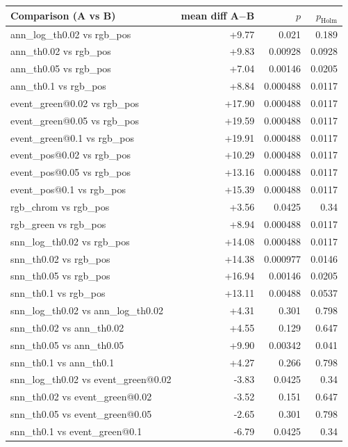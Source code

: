 \begin{tabular}{lrrr}\toprule
Comparison (A vs B) & mean diff A$-$B & $p$ & $p_{\mathrm{Holm}}$ \\\midrule
ann\_log\_th0.02 vs rgb\_pos & +9.77 & 0.021 & 0.189 \\
ann\_th0.02 vs rgb\_pos & +9.83 & 0.00928 & 0.0928 \\
ann\_th0.05 vs rgb\_pos & +7.04 & 0.00146 & 0.0205 \\
ann\_th0.1 vs rgb\_pos & +8.84 & 0.000488 & 0.0117 \\
event\_green@0.02 vs rgb\_pos & +17.90 & 0.000488 & 0.0117 \\
event\_green@0.05 vs rgb\_pos & +19.59 & 0.000488 & 0.0117 \\
event\_green@0.1 vs rgb\_pos & +19.91 & 0.000488 & 0.0117 \\
event\_pos@0.02 vs rgb\_pos & +10.29 & 0.000488 & 0.0117 \\
event\_pos@0.05 vs rgb\_pos & +13.16 & 0.000488 & 0.0117 \\
event\_pos@0.1 vs rgb\_pos & +15.39 & 0.000488 & 0.0117 \\
rgb\_chrom vs rgb\_pos & +3.56 & 0.0425 & 0.34 \\
rgb\_green vs rgb\_pos & +8.94 & 0.000488 & 0.0117 \\
snn\_log\_th0.02 vs rgb\_pos & +14.08 & 0.000488 & 0.0117 \\
snn\_th0.02 vs rgb\_pos & +14.38 & 0.000977 & 0.0146 \\
snn\_th0.05 vs rgb\_pos & +16.94 & 0.00146 & 0.0205 \\
snn\_th0.1 vs rgb\_pos & +13.11 & 0.00488 & 0.0537 \\
snn\_log\_th0.02 vs ann\_log\_th0.02 & +4.31 & 0.301 & 0.798 \\
snn\_th0.02 vs ann\_th0.02 & +4.55 & 0.129 & 0.647 \\
snn\_th0.05 vs ann\_th0.05 & +9.90 & 0.00342 & 0.041 \\
snn\_th0.1 vs ann\_th0.1 & +4.27 & 0.266 & 0.798 \\
snn\_log\_th0.02 vs event\_green@0.02 & -3.83 & 0.0425 & 0.34 \\
snn\_th0.02 vs event\_green@0.02 & -3.52 & 0.151 & 0.647 \\
snn\_th0.05 vs event\_green@0.05 & -2.65 & 0.301 & 0.798 \\
snn\_th0.1 vs event\_green@0.1 & -6.79 & 0.0425 & 0.34 \\
\bottomrule\end{tabular}

